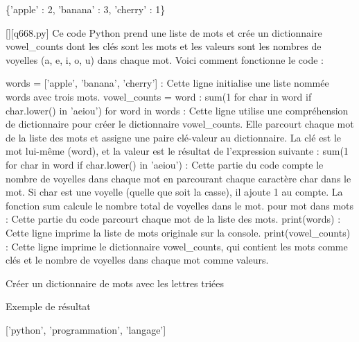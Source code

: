 \{'apple' : 2, 'banana' : 3, 'cherry' : 1\}
        \par
        \begin{solution}
            \renewcommand{\nomfichier}{q668.py}
            \pythonfile{\chemincode \nomfichier}[][\nomfichier]
            Ce code Python prend une liste de mots et crée un dictionnaire vowel_counts dont les clés sont les mots et les valeurs sont les nombres de voyelles (a, e, i, o, u) dans chaque mot. Voici comment fonctionne le code :

    words = ['apple', 'banana', 'cherry'] : Cette ligne initialise une liste nommée words avec trois mots.
    vowel_counts = {word : sum(1 for char in word if char.lower() in 'aeiou') for word in words} : Cette ligne utilise une compréhension de dictionnaire pour créer le dictionnaire vowel_counts. Elle parcourt chaque mot de la liste des mots et assigne une paire clé-valeur au dictionnaire. La clé est le mot lui-même (word), et la valeur est le résultat de l'expression suivante :
        sum(1 for char in word if char.lower() in 'aeiou') : Cette partie du code compte le nombre de voyelles dans chaque mot en parcourant chaque caractère char dans le mot. Si char est une voyelle (quelle que soit la casse), il ajoute 1 au compte. La fonction sum calcule le nombre total de voyelles dans le mot.
        pour mot dans mots : Cette partie du code parcourt chaque mot de la liste des mots.
    print(words) : Cette ligne imprime la liste de mots originale sur la console.
    print(vowel_counts) : Cette ligne imprime le dictionnaire vowel_counts, qui contient les mots comme clés et le nombre de voyelles dans chaque mot comme valeurs.
        \end{solution}
        

        \question
        Créer un dictionnaire de mots avec les lettres triées

Exemple de résultat

['python', 'programmation', 'langage']

